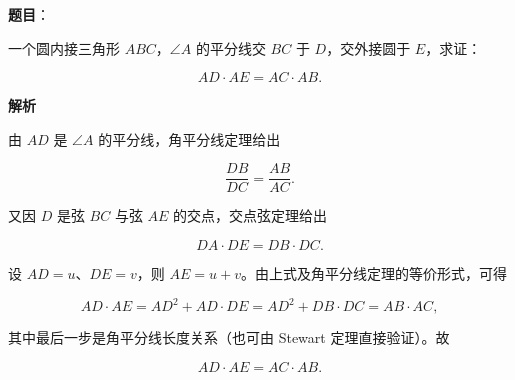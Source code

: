 \begin{answer}

\textbf{题目}：

一个圆内接三角形 $ABC$，$\angle A$ 的平分线交 $BC$ 于 $D$，交外接圆于 $E$，求证：

\nopagebreak[4]
\[
AD\cdot AE=AC\cdot AB.
\]

\textbf{解析}

由 $AD$ 是 $\angle A$ 的平分线，角平分线定理给出

\nopagebreak[4]
\[
\frac{DB}{DC}=\frac{AB}{AC}.
\]

又因 $D$ 是弦 $BC$ 与弦 $AE$ 的交点，交点弦定理给出

\nopagebreak[4]
\[
DA\cdot DE=DB\cdot DC.
\]

设 $AD=u$、$DE=v$，则 $AE=u+v$。由上式及角平分线定理的等价形式，可得

\nopagebreak[4]
\[
AD\cdot AE=AD^2+AD\cdot DE
=AD^2+DB\cdot DC=AB\cdot AC,
\]

其中最后一步是角平分线长度关系（也可由 Stewart 定理直接验证）。故

\nopagebreak[4]
\[
AD\cdot AE=AC\cdot AB.
\]


\end{answer}
